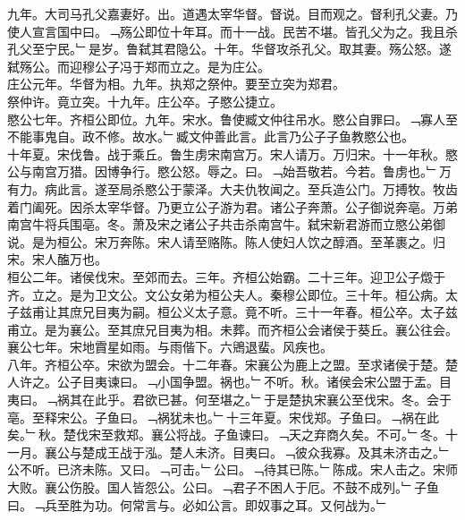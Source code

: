 \documentclass{zhvt-classic}
\begin{document}
\hspace*{2em}九年。大司马孔父嘉妻好。出。道遇太宰华督。督说。目而观之。督利孔父妻。乃使人宣言国中曰。﹁殇公即位十年耳。而十一战。民苦不堪。皆孔父为之。我且杀孔父至宁民。﹂是岁。鲁弑其君隐公。十年。华督攻杀孔父。取其妻。殇公怒。遂弑殇公。而迎穆公子冯于郑而立之。是为庄公。\\
\hspace*{2em}庄公元年。华督为相。九年。执郑之祭仲。要至立突为郑君。\\
\hspace*{2em}祭仲许。竟立突。十九年。庄公卒。子愍公捷立。\\
\hspace*{2em}愍公七年。齐桓公即位。九年。宋水。鲁使臧文仲往吊水。愍公自罪曰。﹁寡人至不能事鬼自。政不修。故水。﹂臧文仲善此言。此言乃公子子鱼教愍公也。\\
\hspace*{2em}十年夏。宋伐鲁。战于乘丘。鲁生虏宋南宫万。宋人请万。万归宋。十一年秋。愍公与南宫万猎。因博争行。愍公怒。辱之。曰。﹁始吾敬若。今若。鲁虏也。﹂万有力。病此言。遂至局杀愍公于蒙泽。大夫仇牧闻之。至兵造公门。万搏牧。牧齿着门阖死。因杀太宰华督。乃更立公子游为君。诸公子奔萧。公子御说奔亳。万弟南宫牛将兵围亳。冬。萧及宋之诸公子共击杀南宫牛。弑宋新君游而立愍公弟御说。是为桓公。宋万奔陈。宋人请至赂陈。陈人使妇人饮之醇酒。至革裹之。归宋。宋人醢万也。\\
\hspace*{2em}桓公二年。诸侯伐宋。至郊而去。三年。齐桓公始霸。二十三年。迎卫公子燬于齐。立之。是为卫文公。文公女弟为桓公夫人。秦穆公即位。三十年。桓公病。太子兹甫让其庶兄目夷为嗣。桓公义太子意。竟不听。三十一年春。桓公卒。太子兹甫立。是为襄公。至其庶兄目夷为相。未葬。而齐桓公会诸侯于葵丘。襄公往会。\\
\hspace*{2em}襄公七年。宋地霣星如雨。与雨偕下。六鶂退蜚。风疾也。\\
\hspace*{2em}八年。齐桓公卒。宋欲为盟会。十二年春。宋襄公为鹿上之盟。至求诸侯于楚。楚人许之。公子目夷谏曰。﹁小国争盟。祸也。﹂不听。秋。诸侯会宋公盟于盂。目夷曰。﹁祸其在此乎。君欲已甚。何至堪之。﹂于是楚执宋襄公至伐宋。冬。会于亳。至释宋公。子鱼曰。﹁祸犹未也。﹂十三年夏。宋伐郑。子鱼曰。﹁祸在此矣。﹂秋。楚伐宋至救郑。襄公将战。子鱼谏曰。﹁天之弃商久矣。不可。﹂冬。十一月。襄公与楚成王战于泓。楚人未济。目夷曰。﹁彼众我寡。及其未济击之。﹂公不听。已济未陈。又曰。﹁可击。﹂公曰。﹁待其已陈。﹂陈成。宋人击之。宋师大败。襄公伤股。国人皆怨公。公曰。﹁君子不困人于厄。不鼓不成列。﹂子鱼曰。﹁兵至胜为功。何常言与。必如公言。即奴事之耳。又何战为。﹂\\
\end{document}
